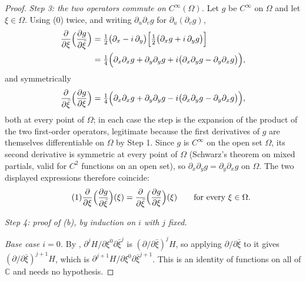 \begin{proof}
\emph{Step 3: the two operators commute on $C^\infty(\Omega)$.}  Let $g$ be
$C^\infty$ on $\Omega$ and let $\xi\in\Omega$.  Using (0) twice, and writing
$\partial_u\partial_vg$ for $\partial_u(\partial_vg)$,
\begin{align*}
  \frac{\partial}{\partial\xi}\Bigl(\frac{\partial g}{\partial\bar\xi}\Bigr)
  &=\tfrac12\bigl(\partial_x-i\,\partial_y\bigr)
     \Bigl[\tfrac12\bigl(\partial_xg+i\,\partial_yg\bigr)\Bigr]\\
  &=\tfrac14\Bigl(\partial_x\partial_xg+\partial_y\partial_yg
      +i\bigl(\partial_x\partial_yg-\partial_y\partial_xg\bigr)\Bigr),
\end{align*}
and symmetrically
\[
  \frac{\partial}{\partial\bar\xi}\Bigl(\frac{\partial g}{\partial\xi}\Bigr)
  =\tfrac14\Bigl(\partial_x\partial_xg+\partial_y\partial_yg
      -i\bigl(\partial_x\partial_yg-\partial_y\partial_xg\bigr)\Bigr),
\]
both at every point of $\Omega$; in each case the step is the expansion of the
product of the two first-order operators, legitimate because the first
derivatives of $g$ are themselves differentiable on $\Omega$ by Step 1.  Since
$g$ is $C^\infty$ on the open set $\Omega$, its second derivative is symmetric
at every point of $\Omega$ (Schwarz's theorem on mixed partials, valid for
$C^2$ functions on an open set), so
$\partial_x\partial_yg=\partial_y\partial_xg$ on $\Omega$.  The two displayed
expressions therefore coincide:
\begin{equation}\tag{1}
  \frac{\partial}{\partial\xi}\Bigl(\frac{\partial g}{\partial\bar\xi}\Bigr)(\xi)
  =\frac{\partial}{\partial\bar\xi}\Bigl(\frac{\partial g}{\partial\xi}\Bigr)(\xi)
  \qquad\text{for every }\xi\in\Omega .
\end{equation}

\emph{Step 4: proof of (b), by induction on $i$ with $j$ fixed.}

\emph{Base case $i=0$.}  By ,
$\partial^{j}H/\partial\xi^0\partial\bar\xi^{j}$ is
$(\partial/\partial\bar\xi)^{j}H$, so applying $\partial/\partial\bar\xi$ to it
gives $(\partial/\partial\bar\xi)^{j+1}H$, which is
$\partial^{j+1}H/\partial\xi^0\partial\bar\xi^{j+1}$.  This is an identity of
functions on all of $\mathbb{C}$ and needs no hypothesis.


\end{proof}
